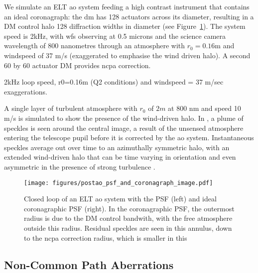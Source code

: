 \documentclass[letterpaper]{ar-1col}
\begin{document}
We simulate an ELT \ac{ao} system feeding a high contrast instrument that contains an ideal coronagraph: the \ac{dm} has 128 actuators across its diameter, resulting in a DM control halo 128 diffraction widths in diameter (see Figure~\ref{fig:ao}). 
%
The system speed is 2kHz, with \ac{wfs} observing at 0.5 microns and the science camera wavelength of 800 nanometres through an atmosphere with $r_0=0.16$m and windspeed of 37 m/s (exaggerated to emphasise the wind driven halo).
%
A second 60 by 60 actuator DM provides \ac{ncpa} correction.

2kHz loop speed, r0=0.16m (Q2 conditions) and windspeed = 37 m/sec exaggerations.

A single layer of turbulent atmosphere with $r_0$ of $2m$ at 800 nm and speed 10 m/s is simulated to show the presence of the wind-driven halo.
%
In , a plume of speckles is seen around the central image, a result of the unsensed atmosphere entering the telescope pupil before it is corrected by the \ac{ao} system. 
%
Instantaneous speckles average out over time to an azimuthally symmetric halo, with an extended wind-driven halo that can be time varying in orientation and even asymmetric in the presence of strong turbulence \citep{Cantalloube18}.


\begin{figure}[ht]
  \centering
  \texttt{[image: figures/postao\_psf\_and\_coronagraph\_image.pdf]}
  \caption{Closed loop of an ELT \ac{ao} system with the PSF (left) and ideal coronagraphic PSF (right).
  In the coronagraphic PSF, the outermost radius is due to the DM control bandwith, with the free atmosphere outside this radius.
  Residual speckles are seen in this annulus, down to the \ac{ncpa} correction radius, which is smaller in this 
  }
  \label{fig:ao}
\end{figure}

\subsection{Non-Common Path Aberrations}
\end{document}
